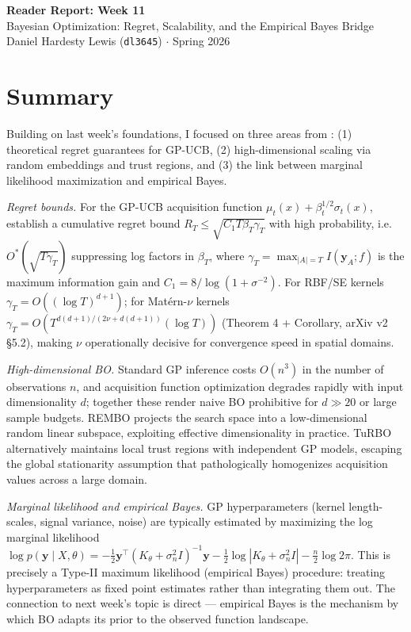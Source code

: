 \documentclass[11pt,twoside]{article}
\begin{document}
\vspace*{-1.5cm}
\begin{center}
{\Large \textbf{Reader Report: Week 11}} \\
\vspace{0.2em}
{\large Bayesian Optimization: Regret, Scalability, and the Empirical Bayes Bridge} \\
\vspace{0.3em}
Daniel Hardesty Lewis (\texttt{dl3645}) $\cdot$ Spring 2026
\end{center}
\vspace{-1.5em}
\thispagestyle{fancy}

\section*{Summary}
Building on last week's foundations, I focused on three areas from \citet{garnett2023bayesian}: (1) theoretical regret guarantees for GP-UCB, (2) high-dimensional scaling via random embeddings and trust regions, and (3) the link between marginal likelihood maximization and empirical Bayes.

\textit{Regret bounds.} For the GP-UCB acquisition function $\mu_t(x) + \beta_t^{1/2}\sigma_t(x)$, \citet{srinivas2010ucb} establish a cumulative regret bound $R_T \leq \sqrt{C_1 T \beta_T \gamma_T}$ with high probability, i.e.\ $O^*\!\left(\sqrt{T \gamma_T}\right)$ suppressing log factors in $\beta_T$, where $\gamma_T = \max_{|A|=T} I(\mathbf{y}_A; f)$ is the maximum information gain and $C_1 = 8/\log(1+\sigma^{-2})$. For RBF/SE kernels $\gamma_T = O((\log T)^{d+1})$; for Mat\'{e}rn-$\nu$ kernels $\gamma_T = O(T^{d(d+1)/(2\nu+d(d+1))}(\log T))$ (Theorem 4 + Corollary, arXiv v2 \S5.2), making $\nu$ operationally decisive for convergence speed in spatial domains.

\textit{High-dimensional BO.} Standard GP inference costs $O(n^3)$ in the number of observations $n$, and acquisition function optimization degrades rapidly with input dimensionality $d$; together these render naive BO prohibitive for $d \gg 20$ or large sample budgets. REMBO \citep{wang2013rembo} projects the search space into a low-dimensional random linear subspace, exploiting effective dimensionality in practice. TuRBO \citep{eriksson2019turbo} alternatively maintains local trust regions with independent GP models, escaping the global stationarity assumption that pathologically homogenizes acquisition values across a large domain.

\textit{Marginal likelihood and empirical Bayes.} GP hyperparameters (kernel length-scales, signal variance, noise) are typically estimated by maximizing the log marginal likelihood $\log p(\mathbf{y} \mid X, \theta) = -\tfrac{1}{2}\mathbf{y}^\top (K_\theta + \sigma_n^2 I)^{-1}\mathbf{y} - \tfrac{1}{2}\log|K_\theta + \sigma_n^2 I| - \tfrac{n}{2}\log 2\pi$. This is precisely a Type-II maximum likelihood (empirical Bayes) procedure: treating hyperparameters as fixed point estimates rather than integrating them out. The connection to next week's topic is direct --- empirical Bayes is the mechanism by which BO adapts its prior to the observed function landscape.
\end{document}
